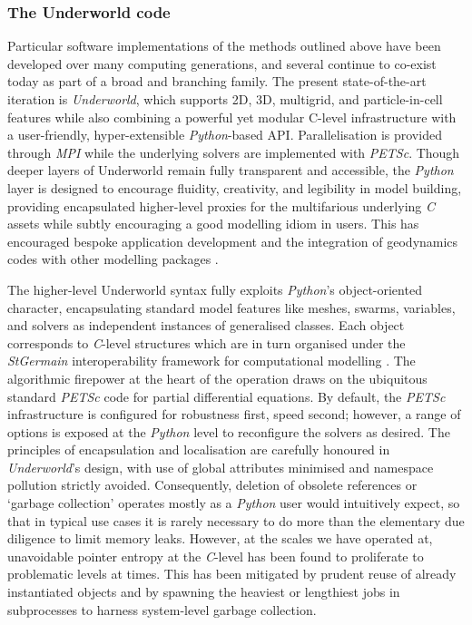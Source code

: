 \documentclass[a4paper,11pt,oneside]{book}
\begin{document}
\subsubsection{The Underworld code}

Particular software implementations of the methods outlined above have been developed over many computing generations, and several continue to co-exist today as part of a broad and branching family. The present state-of-the-art iteration is \textit{Underworld}, which supports 2D, 3D, multigrid, and particle-in-cell features while also combining a powerful yet modular C-level infrastructure \cite{Quenette2007-em} with a user-friendly, hyper-extensible \textit{Python}-based API. Parallelisation is provided through \textit{MPI} while the underlying solvers are implemented with \textit{PETSc}. Though deeper layers of Underworld remain fully transparent and accessible, the \textit{Python} layer is designed to encourage fluidity, creativity, and legibility in model building, providing encapsulated higher-level proxies for the multifarious underlying \textit{C} assets while subtly encouraging a good modelling idiom in users. This has encouraged bespoke application development \cite{Beucher2019-aq} and the integration of geodynamics codes with other modelling packages \cite{Asten2018-qj}.

The higher-level Underworld syntax fully exploits \textit{Python}'s object-oriented character, encapsulating standard model features like meshes, swarms, variables, and solvers as independent instances of generalised classes. Each object corresponds to \textit{C}-level structures which are in turn organised under the \textit{StGermain} interoperability framework for computational modelling \cite{Quenette2007-em}. The algorithmic firepower at the heart of the operation draws on the ubiquitous standard \textit{PETSc} code for partial differential equations. By default, the \textit{PETSc} infrastructure is configured for robustness first, speed second; however, a range of options is exposed at the \textit{Python} level to reconfigure the solvers as desired. The principles of encapsulation and localisation are carefully honoured in \textit{Underworld}'s design, with use of global attributes minimised and namespace pollution strictly avoided. Consequently, deletion of obsolete references or `garbage collection' operates mostly as a \textit{Python} user would intuitively expect, so that in typical use cases it is rarely necessary to do more than the elementary due diligence to limit memory leaks. However, at the scales we have operated at, unavoidable pointer entropy at the \textit{C}-level has been found to proliferate to problematic levels at times. This has been mitigated by prudent reuse of already instantiated objects and by spawning the heaviest or lengthiest jobs in subprocesses to harness system-level garbage collection.
\end{document}
